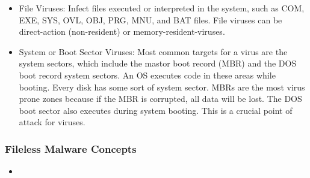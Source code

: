 \begin{itemize}
\begin{itemize}
        \item File Viruses: Infect files executed or interpreted in the system, such as COM, EXE, SYS, OVL, OBJ, PRG, MNU, and BAT files. File viruses can be direct-action (non-resident) or memory-resident-viruses.
        \item System or Boot Sector Viruses: Most common targets for a virus are the system sectors, which include the mastor boot record (MBR) and the DOS boot record system sectors. An OS executes code in these areas while booting. Every disk has some sort of system sector. MBRs are the most virus prone zones because if the MBR is corrupted, all data will be lost. The DOS boot sector also executes during system booting. This is a crucial point of attack for viruses.
    \end{itemize}
\end{itemize}

\subsubsection{Fileless Malware Concepts}
\begin{itemize}
    \item 
\end{itemize}


